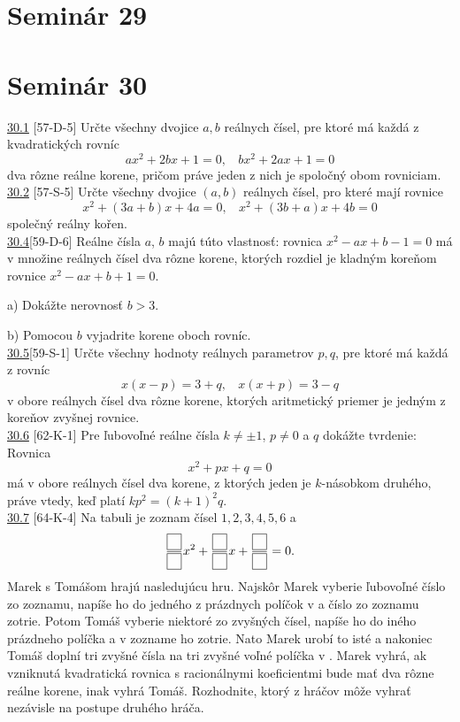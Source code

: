 \section*{Seminár 29}

\section*{Seminár 30}
\noindent \ul{30.1} [57-D-5] \ToDo Určte všechny dvojice $a, b$ reálnych čísel, pre ktoré má každá z
kvadratických rovníc
$$ax^2 + 2bx + 1 = 0, \ \ \ \ bx^2 + 2ax + 1 = 0$$
dva rôzne reálne korene, pričom práve jeden z nich je spoločný obom rovniciam.\\

\noindent \ul{30.2} [57-S-5] \ToDo
Určte všechny dvojice $(a, b)$ reálnych čísel, pro které mají rovnice
$$x^2 + (3a + b)x + 4a = 0, \ \ \ \  x^2 + (3b + a)x + 4b = 0$$
společný reálny kořen.\\

\noindent \ul{30.4}[59-D-6] Reálne čísla $a$, $b$ majú túto vlastnosť: rovnica $x^2 -ax+b-1 = 0$ má v množine reálnych čísel dva rôzne korene, ktorých rozdiel je kladným koreňom rovnice $x^2 - ax + b + 1 = 0$.

a) Dokážte nerovnosť $b > 3$.

b) Pomocou $b$ vyjadrite korene oboch rovníc.\\

\noindent \ul{30.5}[59-S-1] Určte všechny hodnoty reálnych parametrov $p, q$, pre ktoré má každá z rovníc
$$x(x - p) = 3 + q, \ \ \ \ x(x + p) = 3 - q$$
v obore reálnych čísel dva rôzne korene, ktorých aritmetický priemer je jedným z koreňov
zvyšnej rovnice.\\

\noindent \ul{30.6} [62-K-1] Pre ľubovoľné reálne čísla $k\neq \pm 1$, $p \neq 0$ a $q$ dokážte tvrdenie: Rovnica
$$x^2+ px + q = 0$$
má v obore reálnych čísel dva korene, z ktorých jeden je $k$-násobkom druhého, práve vtedy, keď platí $kp^2 = (k + 1)^2 q$.\\

\noindent \ul{30.7} [64-K-4]  Na tabuli je zoznam čísel $1, 2, 3, 4, 5, 6$ a 
$$\frac{\fbox{$\phantom{7}$}}{\fbox{$\phantom{7}$}}x^2+\frac{\fbox{$\phantom{7}$}}{\fbox{$\phantom{7}$}}x + \frac{\fbox{$\phantom{7}$}}{\fbox{$\phantom{7}$}}= 0.$$
Marek s Tomášom hrajú nasledujúcu hru. Najskôr Marek vyberie ľubovoľné číslo zo zoznamu, napíše ho do jedného z prázdnych políčok v  a číslo zo zoznamu zotrie. Potom Tomáš vyberie niektoré zo zvyšných čísel, napíše ho do iného prázdneho políčka a v zozname ho zotrie. Nato Marek urobí to isté a nakoniec Tomáš doplní tri zvyšné čísla na tri zvyšné voľné políčka v . Marek vyhrá, ak vzniknutá kvadratická rovnica s racionálnymi koeficientmi bude mať dva rôzne reálne korene, inak vyhrá Tomáš. Rozhodnite, ktorý z hráčov môže vyhrať nezávisle na postupe druhého
hráča.\\

